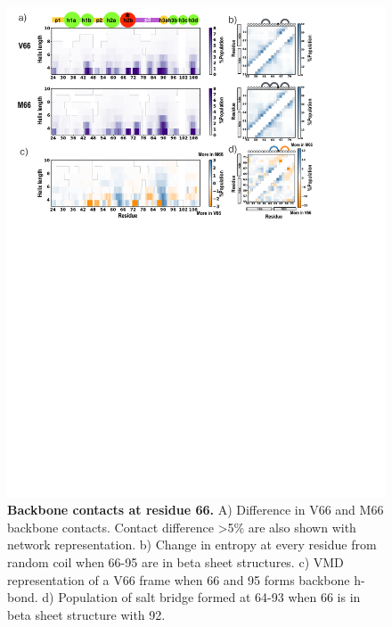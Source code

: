\documentclass[10pt,letterpaper]{article}
\begin{document}
\begin{figure}[!ht]
\includegraphics[scale=0.5,width=\textwidth,trim={0 0cm 0 0cm},clip]{../figures/fig5.pdf}

\caption{{\bf Backbone contacts at residue 66.}
A) Difference in V66 and M66 backbone contacts. Contact difference \textgreater  5\% are also shown with network representation. b) Change in entropy at every residue from random coil when 66-95 are in beta sheet structures. c) VMD representation of a V66 frame when 66 and 95 forms backbone h-bond. d) Population of salt bridge formed at 64-93 when 66 is in beta sheet structure with 92.   
}


\label{fig5} 
\end{figure}
\end{document}
